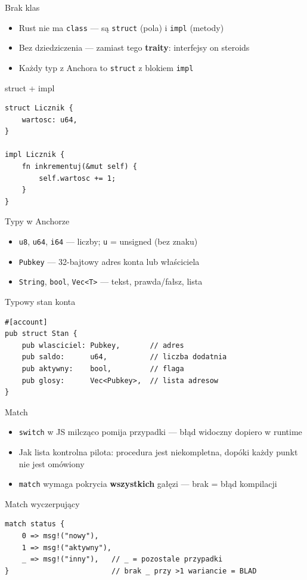 \begin{frame}[fragile]{Brak klas}
  \begin{itemize}
    \item Rust nie ma \texttt{class} --- są \texttt{struct} (pola) i \texttt{impl} (metody)
    \item Bez dziedziczenia --- zamiast tego \textbf{traity}: interfejsy on steroids
    \item Każdy typ z Anchora to \texttt{struct} z blokiem \texttt{impl}
  \end{itemize}
  \begin{block}{struct + impl}
\begin{lstlisting}
struct Licznik {
    wartosc: u64,
}

impl Licznik {
    fn inkrementuj(&mut self) {
        self.wartosc += 1;
    }
}
\end{lstlisting}
  \end{block}
\end{frame}

\begin{frame}[fragile]{Typy w Anchorze}
  \begin{itemize}
    \item \texttt{u8}, \texttt{u64}, \texttt{i64} --- liczby; \texttt{u} = unsigned (bez znaku)
    \item \texttt{Pubkey} --- 32-bajtowy adres konta lub właściciela
    \item \texttt{String}, \texttt{bool}, \texttt{Vec<T>} --- tekst, prawda/fałsz, lista
  \end{itemize}
  \begin{block}{Typowy stan konta}
\begin{lstlisting}
#[account]
pub struct Stan {
    pub wlasciciel: Pubkey,       // adres
    pub saldo:      u64,          // liczba dodatnia
    pub aktywny:    bool,         // flaga
    pub glosy:      Vec<Pubkey>,  // lista adresow
}
\end{lstlisting}
  \end{block}
\end{frame}

\begin{frame}[fragile]{Match}
  \begin{itemize}
    \item \texttt{switch} w JS milcząco pomija przypadki --- błąd widoczny dopiero w runtime
    \item Jak lista kontrolna pilota: procedura jest niekompletna, dopóki każdy punkt nie jest omówiony
    \item \texttt{match} wymaga pokrycia \textbf{wszystkich} gałęzi --- brak = błąd kompilacji
  \end{itemize}
  \begin{alertblock}{Match wyczerpujący}
\begin{lstlisting}
match status {
    0 => msg!("nowy"),
    1 => msg!("aktywny"),
    _ => msg!("inny"),   // _ = pozostale przypadki
}                        // brak _ przy >1 wariancie = BLAD
\end{lstlisting}
  \end{alertblock}
\end{frame}

